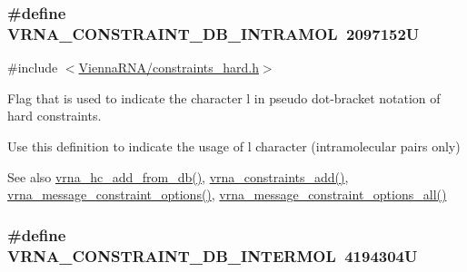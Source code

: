 \subsubsection[{\texorpdfstring{V\+R\+N\+A\+\_\+\+C\+O\+N\+S\+T\+R\+A\+I\+N\+T\+\_\+\+D\+B\+\_\+\+I\+N\+T\+R\+A\+M\+OL}{VRNA_CONSTRAINT_DB_INTRAMOL}}]{\setlength{\rightskip}{0pt plus 5cm}\#define V\+R\+N\+A\+\_\+\+C\+O\+N\+S\+T\+R\+A\+I\+N\+T\+\_\+\+D\+B\+\_\+\+I\+N\+T\+R\+A\+M\+OL~2097152U}\hypertarget{group__hard__constraints_ga5c17253f5a39d1d49b0fb11f5196982a}{}\label{group__hard__constraints_ga5c17253f5a39d1d49b0fb11f5196982a}


{\ttfamily \#include $<$\hyperlink{constraints__hard_8h}{Vienna\+R\+N\+A/constraints\+\_\+hard.\+h}$>$}



Flag that is used to indicate the character \textquotesingle{}l\textquotesingle{} in pseudo dot-\/bracket notation of hard constraints. 

Use this definition to indicate the usage of \textquotesingle{}l\textquotesingle{} character (intramolecular pairs only)

\begin{DoxySeeAlso}{See also}
\hyperlink{group__hard__constraints_ga5b4de3247b67358080c176b94591a8e6}{vrna\+\_\+hc\+\_\+add\+\_\+from\+\_\+db()}, \hyperlink{group__constraints_ga35a401f680969a556858a8dd5f1d07cc}{vrna\+\_\+constraints\+\_\+add()}, \hyperlink{group__constraints_gaa1f20b53bf09ac2e6b0dbb13f7d89670}{vrna\+\_\+message\+\_\+constraint\+\_\+options()}, \hyperlink{group__constraints_gaec7e13fa0465c2acc7a621d1aecb709f}{vrna\+\_\+message\+\_\+constraint\+\_\+options\+\_\+all()} 
\end{DoxySeeAlso}
\subsubsection[{\texorpdfstring{V\+R\+N\+A\+\_\+\+C\+O\+N\+S\+T\+R\+A\+I\+N\+T\+\_\+\+D\+B\+\_\+\+I\+N\+T\+E\+R\+M\+OL}{VRNA_CONSTRAINT_DB_INTERMOL}}]{\setlength{\rightskip}{0pt plus 5cm}\#define V\+R\+N\+A\+\_\+\+C\+O\+N\+S\+T\+R\+A\+I\+N\+T\+\_\+\+D\+B\+\_\+\+I\+N\+T\+E\+R\+M\+OL~4194304U}\hypertarget{group__hard__constraints_ga31d0ebb9755ca8a4acafc14f00ca755d}{}\label{group__hard__constraints_ga31d0ebb9755ca8a4acafc14f00ca755d}


